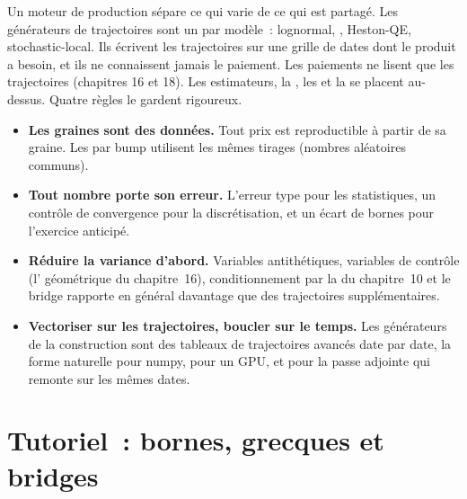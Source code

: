 Un moteur de production sépare ce qui varie de ce qui est partagé. Les générateurs de trajectoires sont un par modèle~: lognormal, , Heston-QE,
stochastic-local. Ils écrivent les trajectoires sur une grille de dates dont le produit a besoin, et ils ne connaissent jamais le paiement. Les paiements ne lisent que les trajectoires (chapitres 16 et
18). Les estimateurs, la , les  et la  se placent au-dessus. Quatre règles le gardent rigoureux.
\begin{itemize}
\item \textbf{Les graines sont des données.} Tout prix est reproductible à partir de sa graine. Les  par bump utilisent les mêmes tirages (nombres aléatoires communs).
\item \textbf{Tout nombre porte son erreur.} L'erreur type pour les statistiques, un contrôle de convergence pour la discrétisation, et un écart de bornes pour
l'exercice anticipé.
\item \textbf{Réduire la variance d'abord.} Variables antithétiques, variables de contrôle (l' géométrique du chapitre~16), conditionnement par la  du chapitre~10 et
le bridge rapporte en général davantage que des trajectoires supplémentaires.
\item \textbf{Vectoriser sur les trajectoires, boucler sur le temps.} Les générateurs de la construction sont des tableaux de trajectoires avancés date par date, la forme naturelle pour numpy, pour
un GPU, et pour la passe adjointe qui remonte sur les mêmes dates.
\end{itemize}

\section{Tutoriel~: bornes, grecques et bridges}\label{tut:dv:monte-carlo-pricers-in-practice:tut}

